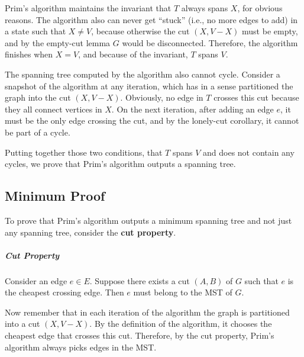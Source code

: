 \documentclass[11pt]{article}
\begin{document}
		Prim's algorithm maintains the invariant that $T$ always spans $X$, for obvious reasons. The algorithm also can never get ``stuck'' (i.e., no more edges to add) in a state such that $X \neq V$, because otherwise the cut $(X, V-X)$ must be empty, and by the empty-cut lemma $G$ would be disconnected. Therefore, the algorithm finishes when $X = V$, and because of the invariant, $T$ spans $V$.
		
		The spanning tree computed by the algorithm also cannot cycle. Consider a snapshot of the algorithm at any iteration, which has in a sense partitioned the graph into the cut $(X, V-X)$. Obviously, no edge in $T$ crosses this cut because they all connect vertices in $X$. On the next iteration, after adding an edge $e$, it must be the only edge crossing the cut, and by the lonely-cut corollary, it cannot be part of a cycle.
		
		Putting together those two conditions, that $T$ spans $V$ and does not contain any cycles, we prove that Prim's algorithm outputs a spanning tree.
		
	\subsection{Minimum Proof}
		To prove that Prim's algorithm outputs a minimum spanning tree and not just any spanning tree, consider the \textbf{cut property}.
		
		\subparagraph{Cut Property} Consider an edge $e\in E$. Suppose there exists a cut $(A, B)$ of $G$ such that $e$ is the cheapest crossing edge. Then $e$ must belong to the MST of $G$.
		
		Now remember that in each iteration of the algorithm the graph is partitioned into a cut $(X, V-X)$. By the definition of the algorithm, it chooses the cheapest edge that crosses this cut. Therefore, by the cut property, Prim's algorithm always picks edges in the MST.
%		
%		


\end{document}
